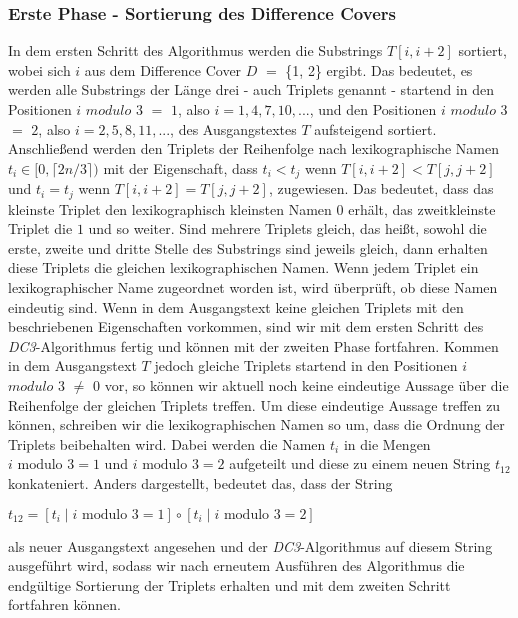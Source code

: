 \subsubsection{Erste Phase - Sortierung des Difference Covers}
\label{dc3:algorithmus:phase1}

In dem ersten Schritt des Algorithmus werden die Substrings $T[i, i+2]$ sortiert, wobei sich $i$ aus dem Difference Cover \(D\) $=$ \{1, 2\} ergibt. Das bedeutet, es werden alle Substrings der Länge drei - auch Triplets genannt - startend in den Positionen \(i\) \(modulo\) \(3\) $=$ \(1\), also $i = 1, 4, 7, 10,...$, und den Positionen \(i\) \(modulo\) \(3\) $=$ \(2\), also $i = 2, 5, 8, 11,...$, des Ausgangstextes $T$ aufsteigend sortiert.
Anschließend werden den Triplets der Reihenfolge nach lexikographische Namen $t_i \in [0,\lceil2n/3\rceil)$ mit der Eigenschaft, dass $t_i < t_j$ wenn $T[i, i+2] < T[j, j+2]$ und $t_i = t_j$ wenn $T[i, i+2] = T[j, j+2]$, zugewiesen. Das bedeutet, dass das kleinste Triplet den lexikographisch kleinsten Namen $0$ erhält, das zweitkleinste Triplet die $1$ und so weiter. Sind mehrere Triplets gleich, das heißt, sowohl die erste, zweite und dritte Stelle des Substrings sind jeweils gleich, dann erhalten diese Triplets die gleichen lexikographischen Namen.
Wenn jedem Triplet ein lexikographischer Name zugeordnet worden ist, wird überprüft, ob diese Namen eindeutig sind. Wenn in dem Ausgangstext keine gleichen Triplets mit den beschriebenen Eigenschaften vorkommen, sind wir mit dem ersten Schritt des \emph{DC3}-Algorithmus fertig und können mit der zweiten Phase fortfahren. Kommen in dem Ausgangstext $T$ jedoch gleiche Triplets startend in den Positionen \(i\) \(modulo\) \(3\) $\neq$ \(0\) vor, so können wir aktuell noch keine eindeutige Aussage über die Reihenfolge der gleichen Triplets treffen. Um diese eindeutige Aussage treffen zu können, schreiben wir die lexikographischen Namen so um, dass die Ordnung der Triplets beibehalten wird. Dabei werden die Namen $t_i$ in die Mengen $i \text{ modulo } 3 = 1$ und $i \text{ modulo } 3 = 2$ aufgeteilt und diese zu einem neuen String $t_{12}$ konkateniert. Anders dargestellt, bedeutet das, dass der String
\begin{center}
	$t_{12} = [t_i \mid i \text{ modulo } 3 = 1] \circ [t_i \mid i \text{ modulo } 3 = 2]$ 
\end{center}
als neuer Ausgangstext angesehen und der \emph{DC3}-Algorithmus auf diesem String ausgeführt wird, sodass wir nach erneutem Ausführen des Algorithmus die endgültige Sortierung der Triplets erhalten und mit dem zweiten Schritt fortfahren können.

